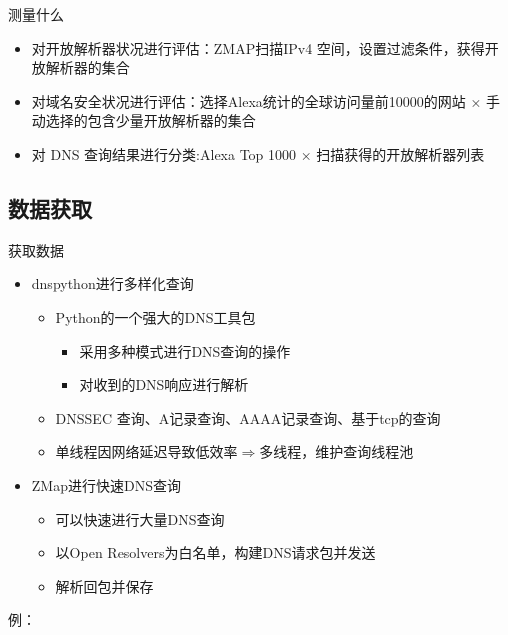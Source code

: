 \documentclass{beamer}
\begin{document}
\begin{frame}{测量什么}
  \begin{itemize}
    \item 对开放解析器状况进行评估：ZMAP扫描IPv4 空间，设置过滤条件，获得开放解析器的集合
    \item 对域名安全状况进行评估：选择Alexa统计的全球访问量前10000的网站 × 手动选择的包含少量开放解析器的集合
    \item 对 DNS 查询结果进行分类:Alexa Top 1000 × 扫描获得的开放解析器列表
  \end{itemize}

\end{frame}

\subsection{数据获取}

\begin{frame}{获取数据}
  \begin{itemize}
    \item dnspython进行多样化查询
    \begin{itemize}
      \item Python的一个强大的DNS工具包
      \begin{itemize}
        \item 采用多种模式进行DNS查询的操作
        \item 对收到的DNS响应进行解析
      \end{itemize}
      \item DNSSEC 查询、A记录查询、AAAA记录查询、基于tcp的查询
      \item 单线程因网络延迟导致低效率\(\Rightarrow\)多线程，维护查询线程池
    \end{itemize}
    \item ZMap进行快速DNS查询
    \begin{itemize}
      \item 可以快速进行大量DNS查询
      \item 以Open Resolvers为白名单，构建DNS请求包并发送
      \item 解析回包并保存
    \end{itemize}

  \end{itemize}
  例：

\end{frame}
\end{document}
